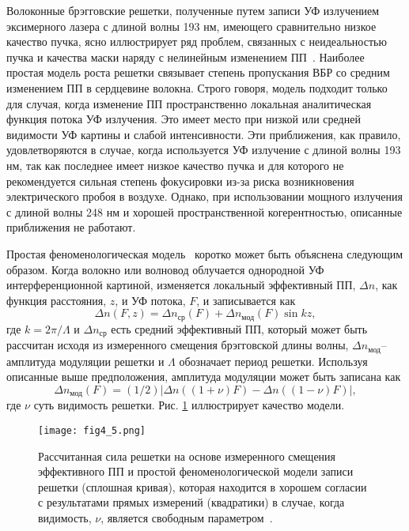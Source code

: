 Волоконные брэгговские решетки, полученные путем записи УФ излучением эксимерного лазера с длиной волны 193 нм, имеющего сравнительно низкое качество пучка, ясно иллюстрирует ряд проблем, связанных с неидеальностью пучка и качества маски наряду с нелинейным изменением ПП~\cite{Hubner97}. Наиболее простая модель роста решетки связывает степень пропускания ВБР со средним изменением ПП в сердцевине волокна. Строго говоря, модель подходит только для случая, когда изменение ПП пространственно локальная аналитическая функция потока УФ излучения. Это имеет место при низкой или средней видимости УФ картины и слабой интенсивности. Эти приближения, как правило, удовлетворяются в случае, когда используется УФ излучение с длиной волны 193 нм, так как последнее имеет низкое качество пучка и для которого не рекомендуется сильная степень фокусировки из-за риска возникновения электрического пробоя в воздухе. Однако, при использовании мощного излучения с длиной волны 248 нм и хорошей пространственной когерентностью, описанные приближения не работают.

Простая феноменологическая модель~\cite{Hubner97} коротко может быть объяснена следующим образом. Когда волокно или волновод облучается однородной УФ интерференционной картиной, изменяется локальный эффективный ПП, $\Delta n$, как функция расстояния, $z$, и УФ потока, $F$, и записывается как
\begin{equation}\label{eq4.1}
  \Delta n(F, z)=\Delta n_{\text{ср}}(F)+\Delta n_{\text{мод}}(F)\sin kz,
\end{equation}
где $k=2\pi /\Lambda$ и $\Delta n_{\text{ср}}$ есть средний эффективный ПП, который может быть рассчитан исходя из измеренного смещения брэгговской длины волны, $\Delta n_{\text{мод}}$– амплитуда модуляции решетки и $\Lambda$ обозначает период решетки. Используя описанные выше предположения, амплитуда модуляции может быть записана как
\begin{equation}\label{eq4.2}
  \Delta n_{\text{мод}}(F)=\left(1/2 \right)\left| \Delta n \left((1+\nu)F \right) - \Delta n \left((1-\nu)F \right)\right|,
\end{equation}
где $\nu$ суть видимость решетки. Рис. \ref{fig4.5} иллюстрирует качество модели.

\begin{figure}
\centering
\texttt{[image: fig4\_5.png]}
\caption{Рассчитанная сила решетки на основе измеренного смещения эффективного ПП и простой феноменологической модели записи решетки (сплошная кривая), которая находится в хорошем согласии с результатами прямых измерений (квадратики) в случае, когда видимость, $\nu$, является свободным параметром~\cite{Hubner97}.}\label{fig4.5}
\end{figure}

